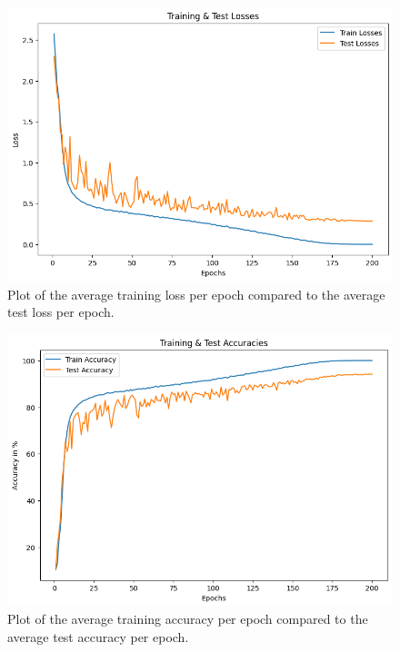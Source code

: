 


\begin{figure}[htbp] 
    \centering
    \includegraphics[width=1\textwidth]{images/ex_1_loss} 
    \caption{Plot of the average training loss per epoch compared to the average test loss per epoch.}
\end{figure}

\begin{figure}[htbp] 
   \centering
   \includegraphics[width=1\textwidth]{images/ex_1_acc} 
   \caption{Plot of the average training accuracy per epoch compared to the average test accuracy per epoch.}
\end{figure}











